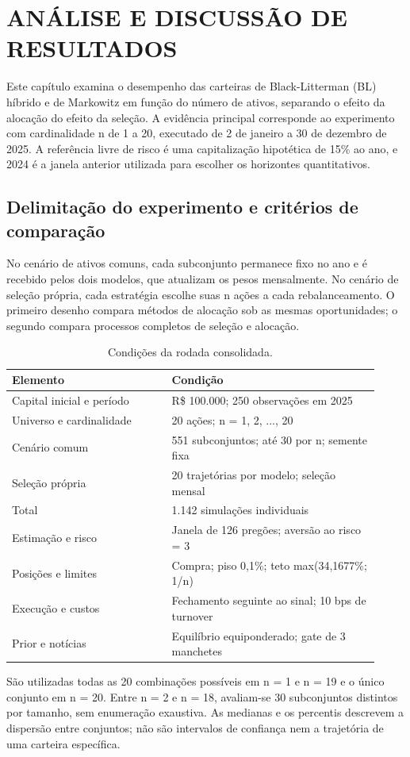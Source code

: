\chapter{ANÁLISE E DISCUSSÃO DE RESULTADOS}
\label{cap:resultados}
\renewcommand{\thetable}{\thechapter.\arabic{table}}
\renewcommand{\thefigure}{\thechapter.\arabic{figure}}
\setcounter{table}{0}\setcounter{figure}{0}
Este capítulo examina o desempenho das carteiras de Black-Litterman (BL) híbrido e de Markowitz em função do número de ativos, separando o efeito da alocação do efeito da seleção. A evidência principal corresponde ao experimento com cardinalidade n de 1 a 20, executado de 2 de janeiro a 30 de dezembro de 2025. A referência livre de risco é uma capitalização hipotética de 15\% ao ano, e 2024 é a janela anterior utilizada para escolher os horizontes quantitativos.

\section{Delimitação do experimento e critérios de comparação}
No cenário de ativos comuns, cada subconjunto permanece fixo no ano e é recebido pelos dois modelos, que atualizam os pesos mensalmente. No cenário de seleção própria, cada estratégia escolhe suas n ações a cada rebalanceamento. O primeiro desenho compara métodos de alocação sob as mesmas oportunidades; o segundo compara processos completos de seleção e alocação.

\begin{table}[H]
\centering
\caption{Condições da rodada consolidada.}
{\footnotesize
\begin{tabular}{p{0.40\linewidth}p{0.52\linewidth}}
\hline
Elemento & Condição \\ \hline
Capital inicial e período & R\$ 100.000; 250 observações em 2025 \\
Universo e cardinalidade & 20 ações; n = 1, 2, ..., 20 \\
Cenário comum & 551 subconjuntos; até 30 por n; semente fixa \\
Seleção própria & 20 trajetórias por modelo; seleção mensal \\
Total & 1.142 simulações individuais \\
Estimação e risco & Janela de 126 pregões; aversão ao risco = 3 \\
Posições e limites & Compra; piso 0,1\%; teto max(34,1677\%; 1/n) \\
Execução e custos & Fechamento seguinte ao sinal; 10 bps de turnover \\
Prior e notícias & Equilíbrio equiponderado; gate de 3 manchetes \\
\hline
\end{tabular}}
\par{}
\end{table}
São utilizadas todas as 20 combinações possíveis em n = 1 e n = 19 e o único conjunto em n = 20. Entre n = 2 e n = 18, avaliam-se 30 subconjuntos distintos por tamanho, sem enumeração exaustiva. As medianas e os percentis descrevem a dispersão entre conjuntos; não são intervalos de confiança nem a trajetória de uma carteira específica.

